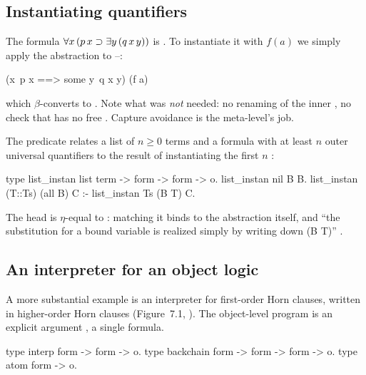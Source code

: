 {{\subsection{Instantiating quantifiers}

The formula $\forall x\,(p\,x\supset\exists y\,(q\,x\,y))$ is . To instantiate
it with $f(a)$ we simply apply the abstraction to  --:
\begin{lprolog}
(x\ p x ==> some y\ q x y) (f a)
\end{lprolog}
which $\beta$-converts to . Note what was \emph{not} needed: no renaming of
the inner , no check that  has no free . Capture avoidance is the meta-level's job.

The predicate  relates a list of $n\ge 0$ terms and a formula with at least $n$ outer
universal quantifiers to the result of instantiating the first $n$ :
\begin{lprolog}
type list_instan  list term -> form -> form -> o.
list_instan nil B B.
list_instan (T::Ts) (all B) C :- list_instan Ts (B T) C.
\end{lprolog}
The head  is $\eta$-equal to : matching it binds  to the abstraction
itself, and \enquote{the substitution for a bound variable is realized simply by writing down (B T)}
.

\subsection{An interpreter for an object logic}\label{sec:lambdatree-interp}

A more substantial example is an interpreter for first-order Horn clauses, written in higher-order Horn
clauses (Figure~7.1, ). The object-level program is an explicit argument , a single formula.
\begin{lprolog}
type interp     form -> form -> o.
type backchain  form -> form -> form -> o.
type atom       form -> o.


\end{lprolog}}}
